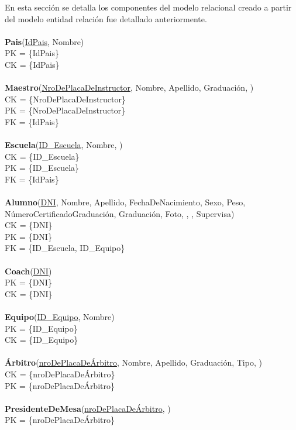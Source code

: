 En esta sección se detalla los componentes del modelo relacional creado a partir del modelo entidad relación fue detallado
anteriormente.\\
\\
\textbf{Pais}(\uline{IdPais}, Nombre)\\
PK = \{IdPais\}\\
CK = \{IdPais\}\\
\\
\textbf{Maestro}(\uline{NroDePlacaDeInstructor}, Nombre, Apellido, Graduación, )\\
CK = \{NroDePlacaDeInstructor\}\\
PK = \{NroDePlacaDeInstructor\}\\
FK = \{IdPais\}\\
\\
\textbf{Escuela}(\uline{ID_Escuela}, Nombre, )\\
CK = \{ID_Escuela\}\\
PK = \{ID_Escuela\}\\
FK = \{IdPais\}\\
\\
\textbf{Alumno}(\uline{DNI}, Nombre, Apellido, FechaDeNacimiento, Sexo, Peso, NúmeroCertificadoGraduación, Graduación,
Foto, , , Supervisa)\\
CK = \{DNI\}\\
PK = \{DNI\}\\
FK = \{ID_Escuela, ID_Equipo\}\\
\\
\textbf{Coach}(\uline{DNI})\\
PK = \{DNI\}\\
CK = \{DNI\}\\
\\
\textbf{Equipo}(\uline{ID_Equipo}, Nombre)\\
PK = \{ID_Equipo\}\\
CK = \{ID_Equipo\}\\
\\
\textbf{Árbitro}(\uline{nroDePlacaDeÁrbitro}, Nombre, Apellido, Graduación, Tipo, )\\
CK = \{nroDePlacaDeÁrbitro\}\\
PK = \{nroDePlacaDeÁrbitro\}\\
\\
\textbf{PresidenteDeMesa}(\uline{nroDePlacaDeÁrbitro}, )\\
PK = \{nroDePlacaDeÁrbitro\}\\
